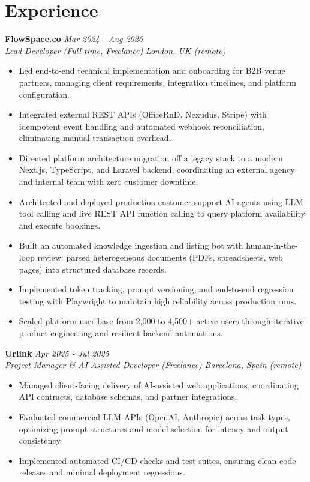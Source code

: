 \documentclass[10pt,a4paper]{article}
\newcommand{\role}[4]{
  \vspace{2pt}
  \noindent\textbf{#1} \hfill \textit{#2} \\
  \textit{\color{text}#3} \hfill \textit{\color{text}#4}
  \vspace{1pt}
}
\begin{document}
\section{Experience}

\role{\href{https://flowspace.co}{FlowSpace.co}}{Mar 2024 - Aug 2026}{Lead Developer (Full-time, Freelance)}{London, UK (remote)}
\begin{itemize}
  \item Led end-to-end technical implementation and onboarding for B2B venue partners, managing client requirements, integration timelines, and platform configuration.
  \item Integrated external REST APIs (OfficeRnD, Nexudus, Stripe) with idempotent event handling and automated webhook reconciliation, eliminating manual transaction overhead.
  \item Directed platform architecture migration off a legacy stack to a modern Next.js, TypeScript, and Laravel backend, coordinating an external agency and internal team with zero customer downtime.
  \item Architected and deployed production customer support AI agents using LLM tool calling and live REST API function calling to query platform availability and execute bookings.
  \item Built an automated knowledge ingestion and listing bot with human-in-the-loop review: parsed heterogeneous documents (PDFs, spreadsheets, web pages) into structured database records.
  \item Implemented token tracking, prompt versioning, and end-to-end regression testing with Playwright to maintain high reliability across production runs.
  \item Scaled platform user base from 2,000 to 4,500+ active users through iterative product engineering and resilient backend automations.
\end{itemize}

\role{Urlink}{Apr 2025 - Jul 2025}{Project Manager \& AI Assisted Developer (Freelance)}{Barcelona, Spain (remote)}
\begin{itemize}
  \item Managed client-facing delivery of AI-assisted web applications, coordinating API contracts, database schemas, and partner integrations.
  \item Evaluated commercial LLM APIs (OpenAI, Anthropic) across task types, optimizing prompt structures and model selection for latency and output consistency.
  \item Implemented automated CI/CD checks and test suites, ensuring clean code releases and minimal deployment regressions.
\end{itemize}
\end{document}
